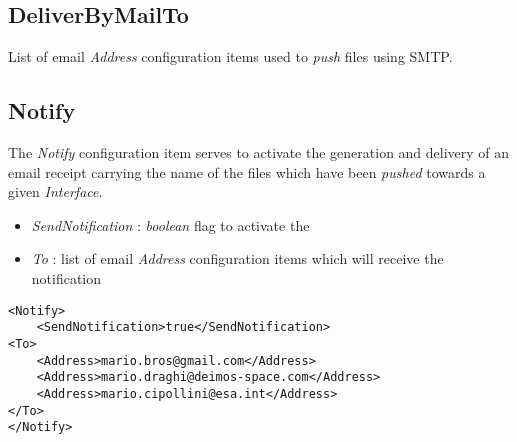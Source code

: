 \documentclass[dec_sum_main.tex]{subfiles}
\begin{document}
\subsection{DeliverByMailTo}
List of email \textit{Address} configuration items used to \textit{push} files using SMTP.

\subsection{Notify}
The \textit{Notify} configuration item serves to activate the generation and delivery of an email receipt carrying the name of the files which have been \textit{pushed} towards a given \textit{Interface}.
\begin{itemize}
	\item \textit{SendNotification} : \textit{boolean} flag to activate the 
	\item \textit{To} : list of email \textit{Address} configuration items which will receive the notification
\end{itemize}

\begin{lstlisting}
<Notify>
	<SendNotification>true</SendNotification>
<To>
	<Address>mario.bros@gmail.com</Address>
	<Address>mario.draghi@deimos-space.com</Address>
	<Address>mario.cipollini@esa.int</Address>
</To>
</Notify>
\end{lstlisting}

\label{Events}
\end{document}
